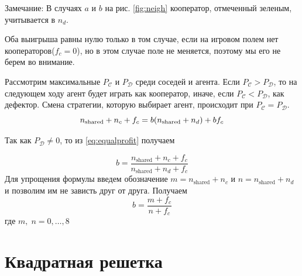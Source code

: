 \documentclass[12pt]{article}
\begin{document}
    Замечание: В случаях $a$ и $b$ на рис. \ref{fig:neigh} кооператор, отмеченный зеленым, учитывается в $n_d$.
    
    Оба выигрыша равны нулю только в том случае, если на игровом полем нет кооператоров($f_c=0$), но в этом случае поле не меняется, поэтому мы его не берем во внимание.
    
    Рассмотрим максимальные $P_{\mathcal{C}}$ и $P_{\mathcal{D}}$ среди соседей и агента. Если $P_{\mathcal{C}}>P_{\mathcal{D}}$, то на следующем ходу агент будет играть как кооператор, иначе, если $P_{\mathcal{C}}<P_{\mathcal{D}}$, как дефектор. Смена стратегии, которую выбирает агент, происходит при $P_{\mathcal{C}}=P_{\mathcal{D}}$.
    \begin{equation}
    \label{eq:equalprofit}
        n_\mathrm{shared} + n_c + f_c = b(n_\mathrm{shared} + n_d) + bf_c\\
    \end{equation}

    Так как $P_{\mathcal{D}}\neq0$, то из \eqref{eq:equalprofit} получаем

    \begin{equation}
        \label{eq:transitions}
        b=\frac{n_\mathrm{shared} + n_c + f_c}{n_\mathrm{shared} + n_d + f_c}
    \end{equation}
    Для упрощения формулы введем обозначение $m=n_\mathrm{shared} + n_c$ и $n=n_\mathrm{shared} + n_d$ и позволим им не зависть друг от друга. Получаем
    \begin{equation*}
        \label{eq:transitions2}
        b=\frac{m + f_c}{n + f_c}
    \end{equation*}
    где $m,\;n=0,\dots,8$

\section{Квадратная решетка}
\end{document}
